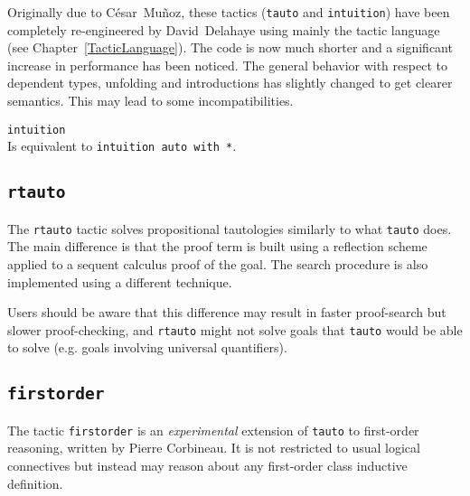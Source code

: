 Originally due to C{\'e}sar~Mu{\~n}oz, these tactics ({\tt tauto} and {\tt intuition})
have been completely re-engineered by David~Delahaye using mainly the tactic
language (see Chapter~\ref{TacticLanguage}). The code is now much shorter and
a significant increase in performance has been noticed. The general behavior
with respect to dependent types, unfolding and introductions has
slightly changed to get clearer semantics. This may lead to some
incompatibilities.

\begin{Variants}
\item {\tt intuition}\\
  Is equivalent to {\tt intuition auto with *}.
\end{Variants}



\subsection{\tt rtauto
\label{rtauto}}

The {\tt rtauto} tactic solves propositional tautologies similarly to what {\tt tauto} does. The main difference is that the proof term is built using a reflection scheme applied to a sequent calculus proof of the goal. The search procedure is also implemented using a different technique. 

Users should be aware that this difference may result in faster proof-search but  slower proof-checking, and {\tt rtauto} might not solve goals that {\tt tauto} would be able to solve (e.g. goals involving universal quantifiers). 

\subsection{{\tt firstorder}
\label{firstorder}}

The tactic \texttt{firstorder} is an {\it experimental} extension of
\texttt{tauto} to  
first-order reasoning, written by Pierre Corbineau. 
It is not restricted to usual logical connectives but
instead may reason about any first-order class inductive definition.

